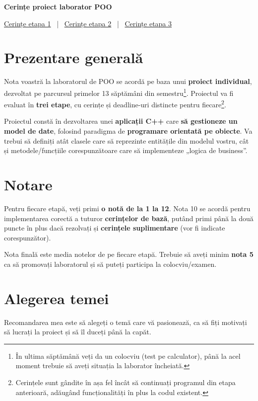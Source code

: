 \textbf{\LARGE Cerințe proiect laborator POO}
\vspace{1.5em}

\hyperref[phase1]{Cerințe etapa 1}
\, | \,
\hyperref[phase2]{Cerințe etapa 2}
\, | \, \hyperref[phase3]{Cerințe etapa 3}

\section*{Prezentare generală}
 
Nota voastră la laboratorul de POO se acordă pe baza unui \textbf{proiect individual}, dezvoltat pe parcursul primelor 13 săptămâni din semestru\footnote{În ultima săptămână veți da un colocviu (test pe calculator), până la acel moment trebuie să aveți situația la laborator încheiată.}. Proiectul va fi evaluat în \textbf{trei etape}, cu cerințe și deadline-uri distincte pentru fiecare\footnote{Cerințele sunt gândite în așa fel încât să continuați programul din etapa anterioară, adăugând funcționalități în plus la codul existent.}.

Proiectul constă în dezvoltarea unei \textbf{aplicații C++} care \textbf{să gestioneze un model de date}, folosind paradigma de \textbf{programare orientată pe obiecte}. Va trebui să definiți atât clasele care să reprezinte entitățile din modelul vostru, cât și metodele/funcțiile corespunzătoare care să implementeze „logica de business”.

\section*{Notare}

Pentru fiecare etapă, veți primi \textbf{o notă de la 1 la 12}. Nota 10 se acordă pentru implementarea corectă a tuturor \textbf{cerințelor de bază}, putând primi până la două puncte în plus dacă rezolvați și \textbf{cerințele suplimentare} (vor fi indicate corespunzător).

Nota finală este media notelor de pe fiecare etapă. Trebuie să aveți minim \textbf{nota 5} ca să promovați laboratorul și să puteți participa la colocviu/examen.

\section*{Alegerea temei}

Recomandarea mea este să alegeți o temă care vă pasionează, ca să fiți motivați să lucrați la proiect și să îl duceți până la capăt.

